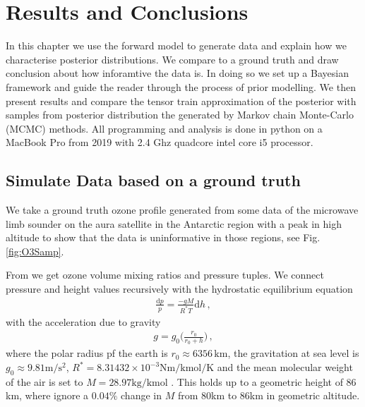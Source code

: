 \chapter{Results and Conclusions}
\label{ch:res}

In this chapter we use the forward model to generate data and explain how we characterise posterior distributions.
We compare to a ground truth and draw conclusion about how inforamtive the data is.
In doing so we set up a Bayesian framework and guide the reader through the process of prior modelling.
We then present results and compare the tensor train approximation of the posterior with samples from posterior distribution the generated by Markov chain Monte-Carlo (MCMC) methods.
All programming and analysis is done in python on a MacBook Pro from 2019 with 2.4 Ghz quadcore intel core i5 processor.

\section{Simulate Data based on a ground truth}
We take a ground truth ozone profile generated from some data \cite{MLSdata} of the microwave limb sounder on the aura satellite in the Antarctic region with a peak in high altitude to show that the data is uninformative in those regions, see Fig. \ref{fig:O3Samp}.

From \cite{MLSdata} we get ozone volume mixing ratios and pressure tuples.
We connect pressure and height values recursively with the hydrostatic equilibrium equation
\begin{align}
	\frac{\text{d}p}{p} = \frac{- g M}{R^* T} \text{d} h \, ,
\end{align}
with the acceleration due to gravity
\begin{align}
	g = g_0 \Bigg( \frac{r_0}{r_0 + h} \Bigg) \, ,
\end{align}
where the polar radius pf the earth is $r_0 \approx 6356 \, \text{km}$, the gravitation at sea level is $g_0 \approx 9.81 \text{m}/\text{s}^2$, $R^* = 8.31432 \times 10^{-3} \text{Nm} / \text{kmol} / \text{K}$ and the mean molecular weight of the air is set to $M = 28.97 \text{kg/kmol}$ \cite{atmosphere1976us}.
This holds up to a geometric height of $86$km, where ignore a $0.04\%$ change in $M$ from $80$km to $86$km in geometric altitude.

